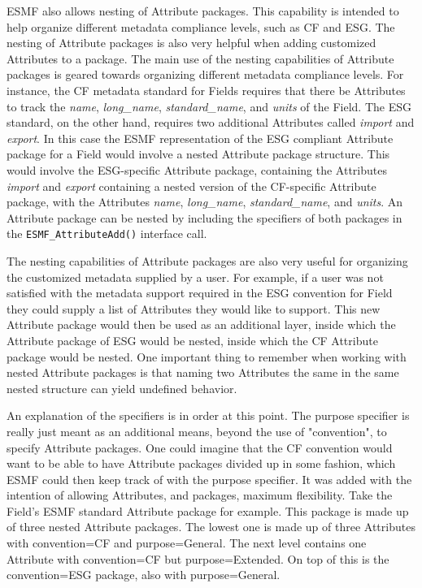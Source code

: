 \vspace{18pt}

ESMF also allows nesting of Attribute packages.  This capability is intended to help organize different metadata compliance levels, such as CF and ESG.  The nesting of Attribute packages is also very helpful when adding customized Attributes to a package.  The main use of the nesting capabilities of Attribute packages is geared towards organizing different metadata compliance levels.  For instance, the CF metadata standard for Fields requires that there be Attributes to track the {\it name}, {\it long\_name}, {\it standard\_name}, and {\it units} of the Field.  The ESG standard, on the other hand, requires two additional Attributes called {\it import} and {\it export}.  In this case the ESMF representation of the ESG compliant Attribute package for a Field would involve a nested Attribute package structure.  This would involve the ESG-specific Attribute package, containing the Attributes {\it import} and {\it export} containing a nested version of the CF-specific Attribute package, with the Attributes {\it name}, {\it long\_name}, {\it standard\_name}, and {\it units}.  An Attribute package can be nested by including the specifiers of both packages in the {\tt ESMF\_AttributeAdd()} interface call.  

The nesting capabilities of Attribute packages are also very useful for organizing the customized metadata supplied by a user.  For example, if a user was not satisfied with the metadata support required in the ESG convention for Field they could supply a list of Attributes they would like to support.  This new Attribute package would then be used as an additional layer, inside which the Attribute package of ESG would be nested, inside which the CF Attribute package would be nested.  One important thing to remember when working with nested Attribute packages is that naming two Attributes the same in the same nested structure can yield undefined behavior.

An explanation of the specifiers is in order at this point.  The purpose 
specifier is really just meant as an additional means, beyond the use of 
"convention", to specify Attribute packages.  One could imagine that the 
CF convention would want to be able to have Attribute packages divided 
up in some fashion, which ESMF could then keep track of with the purpose 
specifier.  It was added with the intention of allowing Attributes, and 
packages, maximum flexibility.  Take the Field's ESMF standard Attribute 
package for example.  This 
package is made up of three nested Attribute packages.  The lowest one 
is made up of three Attributes with convention=CF and purpose=General.  
The next level contains one Attribute with convention=CF but 
purpose=Extended.  On top of this is the convention=ESG package, also 
with purpose=General.
